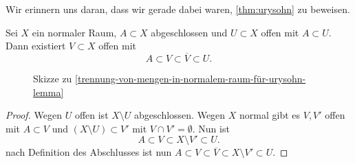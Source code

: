 Wir erinnern uns daran, dass wir gerade dabei waren, \autoref{thm:urysohn} zu beweisen.
\begin{lemma}\label{trennung-von-mengen-in-normalem-raum-für-urysohn-lemma}
    Sei $X$ ein normaler Raum,  $A\subset X$ abgeschlossen und $U\subset X$ offen mit  $A\subset U$. Dann existiert $V\subset X$ offen mit
    \[
    A\subset V\subset \overline{V}\subset U
    .\] 
\end{lemma}
\begin{figure}[ht]
    \centering
    \caption{Skizze zu \autoref{trennung-von-mengen-in-normalem-raum-für-urysohn-lemma}}
    \label{fig:trennung-von-abgeschlossenen-mengen-durch-offene-in-normalem-raum}
\end{figure}
\begin{proof}
    Wegen $U$ offen ist  $X\setminus U$ abgeschlossen. Wegen $X$ normal gibt es  $V,V'$ offen mit  $A\subset V$ und $(X\setminus U)\subset V'$ mit $V\cap V'=\emptyset$. Nun ist
    \[
    A\subset V\subset X\setminus V' \subset U
    .\] 
    nach Definition des Abschlusses ist nun $A\subset V\subset \overline{V} \subset X\setminus V' \subset U$.
\end{proof}

